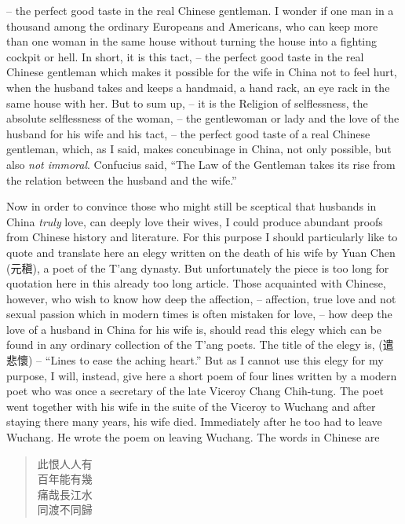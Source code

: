 -- the perfect good taste in the real Chinese gentleman.
I wonder if one man in a thousand among the ordinary Europeans and Americans,
who can keep more than one woman in the same house without turning the house into a fighting cockpit or hell.
In short, it is this tact,  -- the perfect good taste in the real Chinese
gentleman which makes it possible for the wife in China not to feel hurt,
when the husband takes and keeps a handmaid, a hand rack, an eye rack in the same house with her.
But to sum up,  -- it is the Religion of selflessness, the absolute selflessness of the woman,
-- the gentlewoman or lady and the love of the husband for his wife and his tact,
-- the perfect good taste of a real Chinese gentleman,
which, as I said, makes concubinage in China, not only possible, but also \emph{not immoral}.
Confucius said, ``The Law of the Gentleman takes its rise from the relation between the husband and the wife.''

Now in order to convince those who might still be sceptical that husbands in China \emph{truly} love,
can deeply love their wives,
I could produce abundant proofs from Chinese history and literature.
For this purpose I should particularly like to quote and translate here an elegy written on the death of his wife by Yuan Chen (元稹), a poet of the T'ang dynasty.
But unfortunately the piece is too long for quotation here in this already too long article. Those acquainted with Chinese, however, who wish to know how deep the affection,
-- affection, true love and not sexual passion which in modern times is often mistaken for love,  
-- how deep the love of a husband in China for his wife is,
should read this elegy which can be found in any ordinary collection of the T'ang poets.
The title of the elegy is, (遣悲懷) -- ``Lines to ease the aching heart.''
But as I cannot use this elegy for my purpose,
I will, instead, give here a short poem of four lines written by a modern poet who was once a secretary of the late Viceroy Chang Chih-tung.
The poet went together with his wife in the suite of the Viceroy to Wuchang and after staying there many years, his wife died.
Immediately after he too had to leave Wuchang.
He wrote the poem on leaving Wuchang. The words in Chinese are
\begin{quote}
此恨人人有 \\
百年能有幾 \\
痛哉長江水 \\
同渡不同歸
\end{quote}

